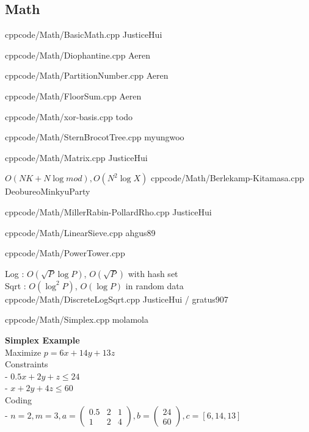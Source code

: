 \documentclass[landscape, 8pt, a4paper, oneside]{extarticle} %
\begin{document}
\begin{multicols*}{3}

\section{Math}

{}{}
{cpp}{code/Math/BasicMath.cpp}
{JusticeHui}

{}{}
{cpp}{code/Math/Diophantine.cpp}
{Aeren}

{}{}
{cpp}{code/Math/PartitionNumber.cpp}
{Aeren}

{}{}
{cpp}{code/Math/FloorSum.cpp}
{Aeren}

{}{}
{cpp}{code/Math/xor-basis.cpp}
{todo}

{}{}
{cpp}{code/Math/SternBrocotTree.cpp}
{myungwoo} %

{}{}
{cpp}{code/Math/Matrix.cpp}
{JusticeHui}


{}{$O(NK + N \log mod), O(N^2 \log X)$}
{cpp}{code/Math/Berlekamp-Kitamasa.cpp}
{DeobureoMinkyuParty}

{}{}
{cpp}{code/Math/MillerRabin-PollardRho.cpp}
{JusticeHui}

{}{}
{cpp}{code/Math/LinearSieve.cpp}
{ahgus89}

{}{}
{cpp}{code/Math/PowerTower.cpp}
{}

{}{Log : $O(\sqrt P \log P)$, $O(\sqrt P)$ with hash set\\Sqrt : $O(\log^2 P)$, $O(\log P)$ in random data}
{cpp}{code/Math/DiscreteLogSqrt.cpp}
{JusticeHui / gratus907}

{}{}
{cpp}{code/Math/Simplex.cpp}
{molamola}

\noindent
\textbf{Simplex Example}\\
Maximize $p = 6x + 14y + 13z$\\
Constraints \\
- $0.5x + 2y + z \leq 24$\\
- $x + 2y + 4z \leq 60$\\
Coding\\
- $n = 2, m = 3, a = \begin{pmatrix} 0.5 & 2 & 1 \\ 1 & 2 & 4 \end{pmatrix}, b = \begin{pmatrix} 24 \\ 60 \end{pmatrix}, c = [6, 14, 13]$


\end{multicols*}
\end{document}
